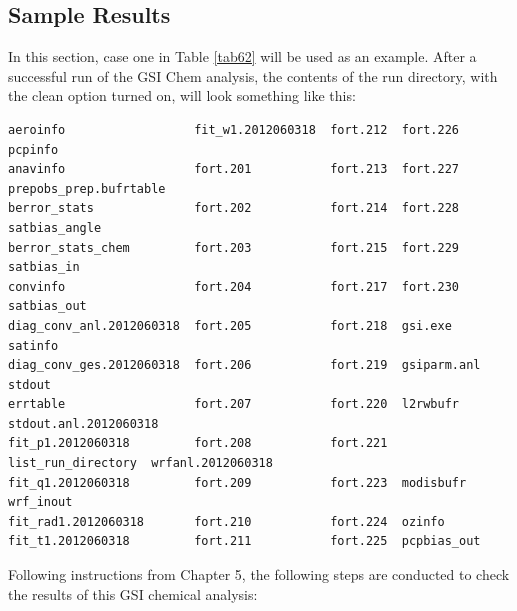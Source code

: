 \subsection{Sample Results}

In this section, case one in Table \ref{tab62} will be used as an example. After a successful run of the GSI Chem analysis, the contents of the run directory, with the clean option turned on, will look something like this:
\begin{scriptsize}
\begin{verbatim}
aeroinfo                  fit_w1.2012060318  fort.212  fort.226            pcpinfo
anavinfo                  fort.201           fort.213  fort.227            prepobs_prep.bufrtable
berror_stats              fort.202           fort.214  fort.228            satbias_angle
berror_stats_chem         fort.203           fort.215  fort.229            satbias_in
convinfo                  fort.204           fort.217  fort.230            satbias_out
diag_conv_anl.2012060318  fort.205           fort.218  gsi.exe             satinfo
diag_conv_ges.2012060318  fort.206           fort.219  gsiparm.anl         stdout
errtable                  fort.207           fort.220  l2rwbufr            stdout.anl.2012060318
fit_p1.2012060318         fort.208           fort.221  list_run_directory  wrfanl.2012060318
fit_q1.2012060318         fort.209           fort.223  modisbufr           wrf_inout
fit_rad1.2012060318       fort.210           fort.224  ozinfo
fit_t1.2012060318         fort.211           fort.225  pcpbias_out
\end{verbatim}
\end{scriptsize}

Following instructions from Chapter 5, the following steps are conducted to check the results of this GSI chemical analysis:

